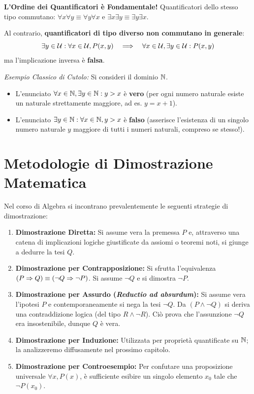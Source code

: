 \begin{avvisoCutolo}
    \textbf{L'Ordine dei Quantificatori è Fondamentale!}
    Quantificatori dello stesso tipo commutano: $\forall x \forall y \equiv \forall y \forall x$ e $\exists x \exists y \equiv \exists y \exists x$.
    
    Al contrario, \textbf{quantificatori di tipo diverso non commutano in generale}:
    \[
        \exists y \in \mathcal{U} : \forall x \in \mathcal{U}, P(x, y) \quad \Longrightarrow \quad \forall x \in \mathcal{U}, \exists y \in \mathcal{U} : P(x, y)
    \]
    ma l'implicazione inversa è \textbf{falsa}.
    
    \emph{Esempio Classico di Cutolo:} Si consideri il dominio $\mathbb{N}$.
    \begin{itemize}
        \item L'enunciato $\forall x \in \mathbb{N}, \exists y \in \mathbb{N} : y > x$ è \textbf{vero} (per ogni numero naturale esiste un naturale strettamente maggiore, ad es. $y = x+1$).
        \item L'enunciato $\exists y \in \mathbb{N} : \forall x \in \mathbb{N}, y > x$ è \textbf{falso} (asserisce l'esistenza di un singolo numero naturale $y$ maggiore di tutti i numeri naturali, compreso se stesso!).
    \end{itemize}
\end{avvisoCutolo}

\section{Metodologie di Dimostrazione Matematica}
Nel corso di Algebra si incontrano prevalentemente le seguenti strategie di dimostrazione:
\begin{enumerate}
    \item \textbf{Dimostrazione Diretta:} Si assume vera la premessa $P$ e, attraverso una catena di implicazioni logiche giustificate da assiomi o teoremi noti, si giunge a dedurre la tesi $Q$.
    \item \textbf{Dimostrazione per Contrapposizione:} Si sfrutta l'equivalenza $(P \Rightarrow Q) \equiv (\neg Q \Rightarrow \neg P)$. Si assume $\neg Q$ e si dimostra $\neg P$.
    \item \textbf{Dimostrazione per Assurdo (\emph{Reductio ad absurdum}):} Si assume vera l'ipotesi $P$ e contemporaneamente si nega la tesi $\neg Q$. Da $(P \wedge \neg Q)$ si deriva una contraddizione logica (del tipo $R \wedge \neg R$). Ciò prova che l'assunzione $\neg Q$ era insostenibile, dunque $Q$ è vera.
    \item \textbf{Dimostrazione per Induzione:} Utilizzata per proprietà quantificate su $\mathbb{N}$; la analizzeremo diffusamente nel prossimo capitolo.
    \item \textbf{Dimostrazione per Controesempio:} Per confutare una proposizione universale $\forall x, P(x)$, è sufficiente esibire un singolo elemento $x_0$ tale che $\neg P(x_0)$.
\end{enumerate}
